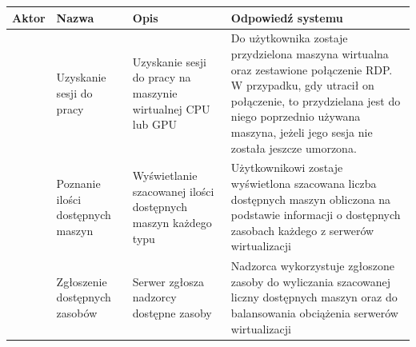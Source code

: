 \documentclass[12pt]{article}
\begin{document}
\begin{center}
	\begin{table}[h!]
		\begin{tabular}{|p{}|p{}|p{}|p{}|}
			\hline Aktor                                                                    & Nazwa                             & Opis                                                          & Odpowiedź systemu                                                                                                                                             \\ \hline
			\multirow{10}{=}{\rotatebox{90}{Użytkownik}}                                    & Uzyskanie sesji do pracy          & Uzyskanie sesji do pracy na maszynie wirtualnej CPU lub GPU   & Do użytkownika zostaje przydzielona maszyna wirtualna oraz zestawione połączenie RDP. W przypadku, gdy utracił on połączenie, to przydzielana jest do niego poprzednio używana maszyna, jeżeli jego sesja nie została jeszcze umorzona.                                                                     \\ \cline{2-4}
			                                                                                & Poznanie ilości dostępnych maszyn & Wyświetlanie szacowanej ilości dostępnych maszyn każdego typu & Użytkownikowi zostaje wyświetlona szacowana liczba dostępnych maszyn obliczona na podstawie informacji o dostępnych zasobach każdego z serwerów wirtualizacji \\ \hline
			\multirow[b]{5}{=}{\rotatebox{90}{\parbox{1cm}{Serwer \newline wirtualizacji}}} & Zgłoszenie dostępnych zasobów     & Serwer zgłosza nadzorcy dostępne zasoby                       & Nadzorca wykorzystuje zgłoszone zasoby do wyliczania szacowanej liczny dostępnych maszyn oraz do balansowania obciążenia serwerów wirtualizacji               \\
			\hline
		\end{tabular}
	\end{table}
\end{center}

\pagebreak
\end{document}

